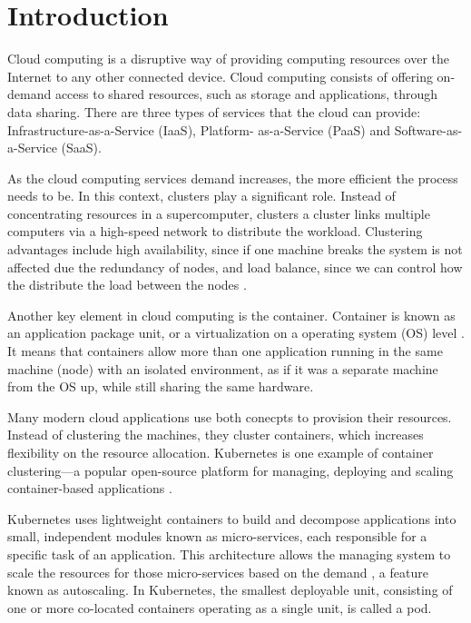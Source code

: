 \section{Introduction} %


Cloud computing is a disruptive way of providing computing resources over the Internet to any other connected device. Cloud computing consists of offering on-demand access to shared resources, such as storage and applications, through data sharing. There are three types of services that the cloud can provide: Infrastructure-as-a-Service (IaaS), Platform-
as-a-Service (PaaS) and Software-as-a-Service (SaaS)\cite{Prajapati_2018}.

As the cloud computing services demand increases, the more efficient the process needs to be. In this context, clusters play a significant role. Instead of concentrating resources in a supercomputer, clusters a cluster links multiple computers via a high-speed network to distribute the workload. Clustering advantages include high availability, since if one machine breaks the system is not affected due the redundancy of nodes, and load balance, since we can control how the distribute the load between the nodes \cite{Sadashiv_2011}. 

Another key element in cloud computing is the container. Container is known as an application package unit, or a virtualization on a operating system (OS) level \cite{Siddiqui_2019}. It means that containers allow more than one application running in the same machine (node) with an isolated environment, as if it was a separate machine from the OS up, while still sharing the same hardware.

Many modern cloud applications use both conecpts to provision their resources. Instead of clustering the machines, they cluster containers, which increases flexibility on the resource allocation. Kubernetes is one example of container clustering—a popular open-source platform for managing, deploying and scaling container-based applications \cite{Senjab_2023}.

Kubernetes uses lightweight containers to build and decompose applications into small, independent modules known as micro-services, each responsible for a specific task of an application. This architecture allows the managing system to scale the resources for those micro-services based on the demand \cite{Senjab_2023}, a feature known as autoscaling. In Kubernetes, the smallest deployable unit, consisting of one or more co-located containers operating as a single unit, is called a pod.

